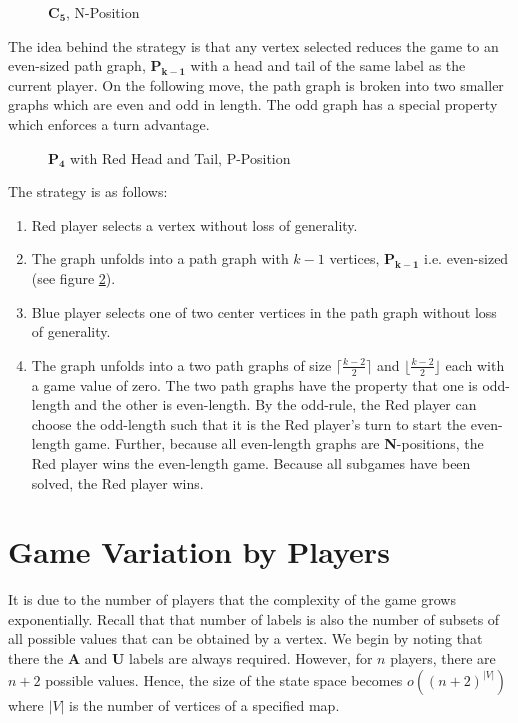 \documentclass{sig-alternate}
\newcommand\npos[0]{\textbf{N}}
\begin{document}
	\begin{figure}[h]
		\label{fig:c5}
		\centering
		\begin{tikzpicture}[node distance=1cm]
		
		\end{tikzpicture}
		\caption{$\mathbf{C_5}$, N-Position}
	\end{figure}
	The idea behind the strategy is that any vertex selected reduces the game
	to an even-sized path graph, $\mathbf{P_{k-1}}$ with a head and tail of the
	same label as the current player. On the following move, the path graph is
	broken into two smaller graphs which are even and odd in length. The odd
	graph has a special property which enforces a turn advantage.
	\begin{figure}[h]
		\label{fig:P4-Head-Tail}
		\centering
		\begin{tikzpicture}[node distance=1cm]
		
		\end{tikzpicture}
		\caption{$\mathbf{P_4}$ with Red Head and Tail, P-Position}
	\end{figure}
	The strategy is as follows:
	\begin{enumerate}
		\item Red player selects a vertex without loss of generality.
		\item The graph unfolds into a path graph with $k-1$ vertices,
			$\mathbf{P_{k-1}}$ i.e. even-sized (see figure \ref{fig:P4-Head-Tail}).
		\item Blue player selects one of two center vertices in the path graph
			without loss of generality.
		\item The graph unfolds into a two path graphs of size $\lceil\frac{k -
			2}{2}\rceil$ and $\lfloor\frac{k - 2}{2}\rfloor$ each with a game
			value of zero. The two path graphs have the property that one is odd-length and the
			other is even-length. By the odd-rule, the Red player can choose
			the odd-length such that it is the Red player's turn to start the
			even-length game. Further, because all even-length graphs are
			\npos-positions, the Red player wins the even-length game. Because
			all subgames have been solved, the Red player wins.
	\end{enumerate}

\section{Game Variation by Players}

It is due to the number of players that the complexity of the game grows
exponentially. Recall that that number of labels is also the number of subsets
of all possible values that can be obtained by a vertex. We begin by noting
that there the $\mathbf{A}$ and $\mathbf{U}$ labels are always required.
However, for $n$ players, there are $n + 2$ possible values. Hence, the size of
the state space becomes $o((n+2)^{|V|})$ where $|V|$ is the number of vertices
of a specified map.
\end{document}
